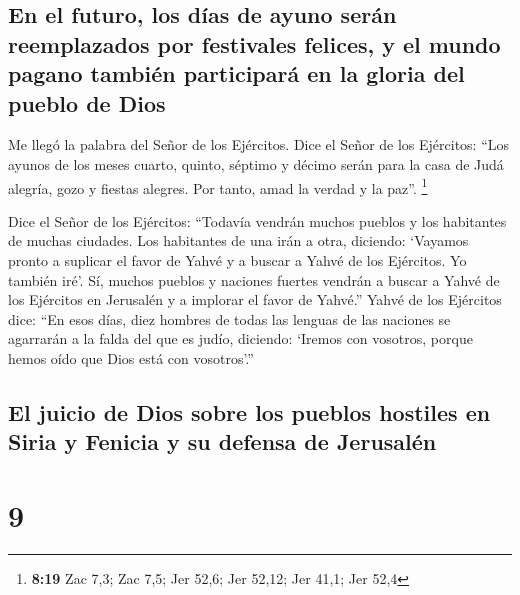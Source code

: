 \hypertarget{en-el-futuro-los-duxedas-de-ayuno-seruxe1n-reemplazados-por-festivales-felices-y-el-mundo-pagano-tambiuxe9n-participaruxe1-en-la-gloria-del-pueblo-de-dios}{%
\subsection{En el futuro, los días de ayuno serán reemplazados por
festivales felices, y el mundo pagano también participará en la gloria
del pueblo de
Dios}\label{en-el-futuro-los-duxedas-de-ayuno-seruxe1n-reemplazados-por-festivales-felices-y-el-mundo-pagano-tambiuxe9n-participaruxe1-en-la-gloria-del-pueblo-de-dios}}

 Me llegó la palabra del Señor de los Ejércitos.
 Dice el Señor de los Ejércitos: ``Los ayunos de los
meses cuarto, quinto, séptimo y décimo serán para la casa de Judá
alegría, gozo y fiestas alegres. Por tanto, amad la verdad y la paz''.
\footnote{\textbf{8:19} Zac 7,3; Zac 7,5; Jer 52,6; Jer 52,12; Jer 41,1;
  Jer 52,4}

 Dice el Señor de los Ejércitos: ``Todavía vendrán muchos
pueblos y los habitantes de muchas ciudades.  Los
habitantes de una irán a otra, diciendo: `Vayamos pronto a suplicar el
favor de Yahvé y a buscar a Yahvé de los Ejércitos. Yo también iré'.
 Sí, muchos pueblos y naciones fuertes vendrán a buscar a
Yahvé de los Ejércitos en Jerusalén y a implorar el favor de Yahvé.''
 Yahvé de los Ejércitos dice: ``En esos días, diez
hombres de todas las lenguas de las naciones se agarrarán a la falda del
que es judío, diciendo: `Iremos con vosotros, porque hemos oído que Dios
está con vosotros'.''

\hypertarget{el-juicio-de-dios-sobre-los-pueblos-hostiles-en-siria-y-fenicia-y-su-defensa-de-jerusaluxe9n}{%
\subsection{El juicio de Dios sobre los pueblos hostiles en Siria y
Fenicia y su defensa de
Jerusalén}\label{el-juicio-de-dios-sobre-los-pueblos-hostiles-en-siria-y-fenicia-y-su-defensa-de-jerusaluxe9n}}

\hypertarget{section-8}{%
\section{9}\label{section-8}}

